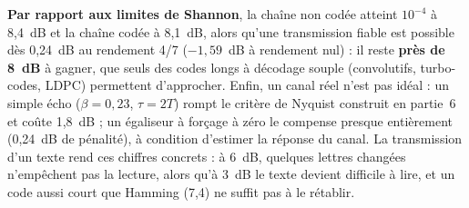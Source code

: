 \documentclass[10pt,a4paper]{article}
\begin{document}
\textbf{Par rapport aux limites de Shannon}, la chaîne non codée atteint $10^{-4}$ à 8,4~dB et la chaîne codée à 8,1~dB, alors qu'une transmission fiable est possible dès 0,24~dB au rendement 4/7 ($-1,59$~dB à rendement nul) : il reste \textbf{près de 8~dB} à gagner, que seuls des codes longs à décodage souple (convolutifs, turbo-codes, LDPC) permettent d'approcher. Enfin, un canal réel n'est pas idéal : un simple écho ($\beta = 0,23$, $\tau = 2T$) rompt le critère de Nyquist construit en partie~6 et coûte 1,8~dB ; un égaliseur à forçage à zéro le compense presque entièrement (0,24~dB de pénalité), à condition d'estimer la réponse du canal. La transmission d'un texte rend ces chiffres concrets : à 6~dB, quelques lettres changées n'empêchent pas la lecture, alors qu'à 3~dB le texte devient difficile à lire, et un code aussi court que Hamming (7,4) ne suffit pas à le rétablir.
\end{document}
